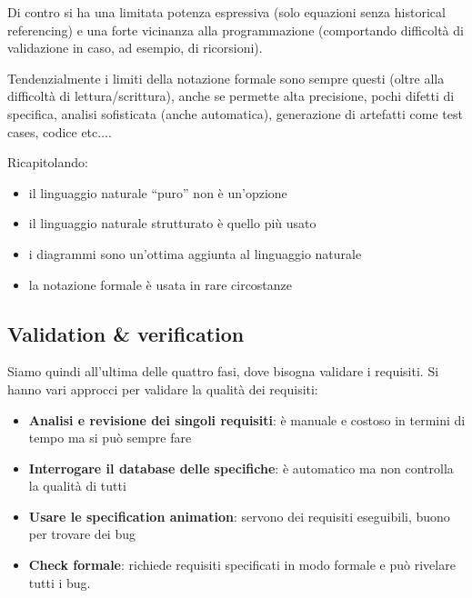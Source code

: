Di contro si ha una limitata potenza espressiva (solo equazioni senza historical
referencing) e una forte vicinanza alla programmazione (comportando difficoltà
di validazione in caso, ad esempio, di ricorsioni).

Tendenzialmente i limiti della notazione formale sono sempre questi (oltre alla
difficoltà di lettura/scrittura), anche se permette alta precisione, pochi difetti
di specifica, analisi sofisticata (anche automatica), generazione di artefatti
come test cases, codice etc$\dots$.

Ricapitolando:
\begin{itemize}
    \item il linguaggio naturale “puro” non è un'opzione
    \item il linguaggio naturale strutturato è quello più usato
    \item i diagrammi sono un'ottima aggiunta al linguaggio naturale
    \item la notazione formale è usata in rare circostanze
\end{itemize}
\subsection{Validation \& verification}
Siamo quindi all'ultima delle quattro fasi, dove bisogna validare i requisiti.
Si hanno vari approcci per validare la qualità dei requisiti:
\begin{itemize}
	\item \textbf{Analisi e revisione dei singoli requisiti}: è manuale e costoso in 
      termini di tempo ma si può sempre fare
	\item \textbf{Interrogare il database delle specifiche}: è automatico ma non 
      controlla la qualità di tutti
	\item \textbf{Usare le specification animation}: servono dei requisiti eseguibili, 
      buono per trovare dei bug
	\item \textbf{Check formale}: richiede requisiti specificati in modo 
      formale e può rivelare tutti i bug.
\end{itemize}

